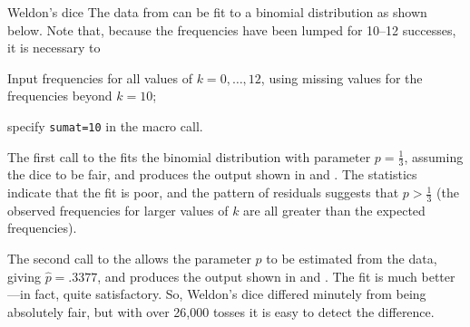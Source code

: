 \begin{Example}[weldon]{Weldon's dice}
The data from 
can be fit to a binomial distribution as shown below.
Note that, because the frequencies have been lumped for 10--12
successes, it is necessary to
\begin{seriate}
\item Input frequencies for all values of $k = 0, \dots, 12$,
using missing values for the frequencies beyond $k=10$;
\item specify \texttt{sumat=10} in the macro call.
\end{seriate}


The first call to the  fits the binomial distribution
with parameter $p = \frac13$, assuming the dice to be fair,
and produces the output shown in  and .
The \chisq{} statistics indicate that the fit is poor,
and the pattern of residuals
suggests that $p > \frac13$
(the observed frequencies for larger values of $k$ are all
greater than the expected frequencies).
\begin{Output}
\caption{Fitting Binomial(12,$\frac13$) to Weldon's dice data: Observed and fitted frequencies}\label{out:dice.1}

\end{Output}
\begin{Output}
\caption{Fitting Binomial(12,$\frac13$) to Weldon's dice data: Goodness of fit tests}\label{out:dice.2}

\end{Output}

The second call to the  allows the
 parameter $p$ to be estimated from the data, giving $\hat{p} = .3377$,
and produces the output shown in  and .
The fit is much better---in fact, quite satisfactory.
So, Weldon's dice differed minutely from being absolutely fair,
but with over 26,000 tosses it is easy to detect the difference.
\begin{Output}
\caption{Fitting Binomial(12,$p$) to Weldon's dice data: Observed and fitted frequencies}\label{out:dice.3}

\end{Output}
\begin{Output}
\caption{Fitting Binomial(12,$p$) to Weldon's dice data: Goodness of fit tests}\label{out:dice.4}

\end{Output}
\end{Example}

